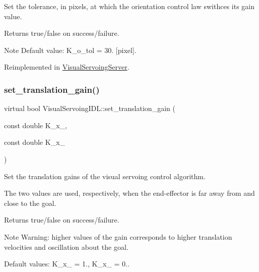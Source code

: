 Set the tolerance, in pixels, at which the orientation control law swithces its gain value. 

\begin{DoxyReturn}{Returns}
true/false on success/failure. 
\end{DoxyReturn}
\begin{DoxyNote}{Note}
Default value\+: K\+\_\+o\+\_\+tol = 30. \mbox{[}pixel\mbox{]}. 
\end{DoxyNote}


Reimplemented in \hyperlink{classVisualServoingServer_a7d8c034f8a133f13ba9b4060ebcaf4bb}{Visual\+Servoing\+Server}.

\mbox{\label{classVisualServoingIDL_a49034ed3c3d7b150ea0edb984217af31}} 
\subsubsection{\texorpdfstring{set\+\_\+translation\+\_\+gain()}{set\_translation\_gain()}}
{\footnotesize\ttfamily virtual bool Visual\+Servoing\+I\+D\+L\+::set\+\_\+translation\+\_\+gain (\begin{DoxyParamCaption}\item[{const double}]{K\+\_\+x\+\_,  }\item[{const double}]{K\+\_\+x\+\_ }\end{DoxyParamCaption})\hspace{0.3cm}{\ttfamily [virtual]}}



Set the translation gains of the visual servoing control algorithm. 

The two values are used, respectively, when the end-\/effector is far away from and close to the goal. \begin{DoxyReturn}{Returns}
true/false on success/failure. 
\end{DoxyReturn}
\begin{DoxyNote}{Note}
Warning\+: higher values of the gain corresponds to higher translation velocities and oscillation about the goal. 

Default values\+: K\+\_\+x\+\_ = 1., K\+\_\+x\+\_ = 0.. 
\end{DoxyNote}


